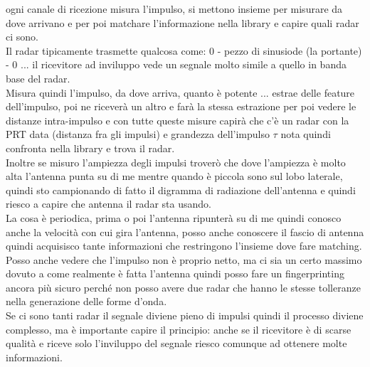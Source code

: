 \documentclass[oneside, 12pt]{extbook}
\begin{document}
ogni canale di ricezione misura l'impulso, si mettono insieme per misurare da dove arrivano e per poi matchare l'informazione nella library e capire quali radar ci sono.\\
Il radar tipicamente trasmette qualcosa come: 0 - pezzo di sinusiode (la portante) - 0 ... il ricevitore ad inviluppo vede un segnale molto simile a quello in banda base del radar.\\
Misura quindi l'impulso, da dove arriva, quanto è potente ... estrae delle feature dell'impulso, poi ne riceverà un altro e farà la stessa estrazione per poi vedere le distanze intra-impulso e con tutte queste misure capirà che c'è un radar con la PRT data (distanza fra gli impulsi) e grandezza dell'impulso $\tau$ nota quindi confronta nella library e trova il radar.\\
Inoltre se misuro l'ampiezza degli impulsi troverò che dove l'ampiezza è molto alta l'antenna punta su di me mentre quando è piccola sono sul lobo laterale, quindi sto campionando di fatto il digramma di radiazione dell'antenna e quindi riesco a capire che antenna il radar sta usando.\\
La cosa è periodica, prima o poi l'antenna ripunterà su di me quindi conosco anche la velocità con cui gira l'antenna, posso anche conoscere il fascio di antenna quindi acquisisco tante informazioni che restringono l'insieme dove fare matching.\\
Posso anche vedere che l'impulso non è proprio netto, ma ci sia un certo massimo dovuto a come realmente è fatta l'antenna quindi posso fare un fingerprinting ancora più sicuro perché non posso avere due radar che hanno le stesse tolleranze nella generazione delle forme d'onda.\\
Se ci sono tanti radar il segnale diviene pieno di impulsi quindi il processo diviene complesso, ma è importante capire il principio: anche se il ricevitore è di scarse qualità e riceve solo l'inviluppo del segnale riesco comunque ad ottenere molte informazioni.
\end{document}
